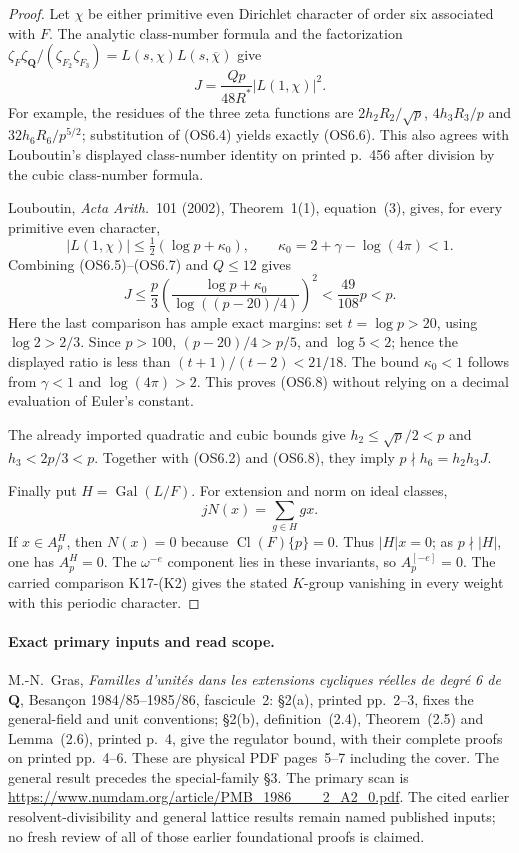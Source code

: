 \begin{proof}
Let $\chi$ be either primitive even Dirichlet character of
order six associated with $F$.  The analytic class-number
formula and the factorization
$\zeta_F\zeta_{\mathbf Q}/(\zeta_{F_2}\zeta_{F_3})
=L(s,\chi)L(s,\overline\chi)$ give
\[
                  J=\frac{Qp}{48R^*}|L(1,\chi)|^2.
                                                               \tag{OS6.6}
\]
For example, the residues of the three zeta functions are
$2h_2R_2/\sqrt p$, $4h_3R_3/p$ and
$32h_6R_6/p^{5/2}$; substitution of (OS6.4) yields exactly
(OS6.6).  This also agrees with Louboutin's displayed
class-number identity on printed p.~456 after division
by the cubic class-number formula.

Louboutin, \emph{Acta Arith.}~101 (2002), Theorem~1(1),
equation~(3), gives, for every primitive even character,
\[
 |L(1,\chi)|\le\tfrac12(\log p+\kappa_0),
 \qquad\kappa_0=2+\gamma-\log(4\pi)<1.                \tag{OS6.7}
\]
Combining (OS6.5)--(OS6.7) and $Q\le12$ gives
\[
 J\le\frac p3
       \left(\frac{\log p+\kappa_0}
       {\log((p-20)/4)}\right)^2
   <\frac{49}{108}p<p.                                \tag{OS6.8}
\]
Here the last comparison has ample exact margins: set
$t=\log p>20$, using $\log2>2/3$.  Since $p>100$,
$(p-20)/4>p/5$, and $\log5<2$; hence the displayed
ratio is less than $(t+1)/(t-2)<21/18$.
The bound $\kappa_0<1$ follows from $\gamma<1$ and
$\log(4\pi)>2$.
This proves (OS6.8) without relying on a decimal
evaluation of Euler's constant.

The already imported quadratic and cubic bounds give
$h_2\le\sqrt p/2<p$ and $h_3<2p/3<p$.
Together with (OS6.2) and (OS6.8), they imply
$p\nmid h_6=h_2h_3J$.

Finally put $H=\operatorname{Gal}(L/F)$.
For extension and norm on ideal classes,
\[
                       jN(x)=\sum_{g\in H}g x.         \tag{OS6.9}
\]
If $x\in A_p^H$, then $N(x)=0$ because
$\operatorname{Cl}(F)\{p\}=0$.  Thus $|H|x=0$;
as $p\nmid|H|$, one has $A_p^H=0$.
The $\omega^{-e}$ component lies in these invariants,
so $A_p^{[-e]}=0$.  The carried comparison K17-(K2)
gives the stated $K$-group vanishing in every weight
with this periodic character.
\end{proof}

\paragraph{Exact primary inputs and read scope.}
M.-N.~Gras, \emph{Familles d'unit\'es dans les extensions
cycliques r\'eelles de degr\'e 6 de $\mathbf Q$},
Besan\c con 1984/85--1985/86, fascicule~2:
\S2(a), printed pp.~2--3, fixes the general-field and unit
conventions; \S2(b), definition~(2.4), Theorem~(2.5)
and Lemma~(2.6), printed p.~4, give the regulator bound,
with their complete proofs on printed pp.~4--6.
These are physical PDF pages~5--7 including the cover.
The general result precedes the special-family \S3.
The primary scan is
\url{https://www.numdam.org/article/PMB_1986___2_A2_0.pdf}.
The cited earlier resolvent-divisibility and general
lattice results remain named published inputs; no fresh
review of all of those earlier foundational proofs is claimed.


